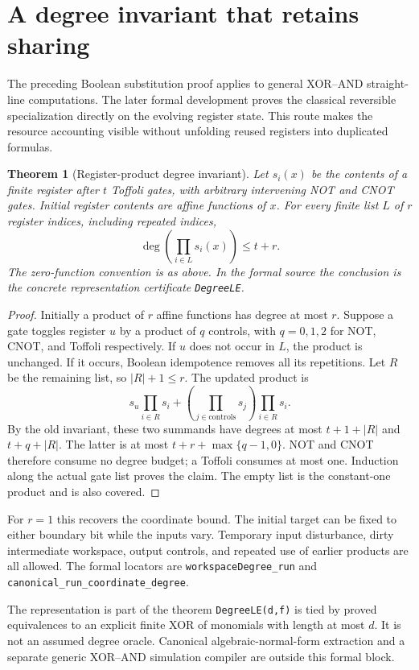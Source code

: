 \documentclass[11pt,letterpaper,oneside]{report}
\theoremstyle{komorebi}
\newtheorem{theorem}{Theorem}[chapter]
\begin{document}
\section{A degree invariant that retains sharing}
The preceding Boolean substitution proof applies to general XOR--AND straight-line computations. The later formal development proves the classical reversible specialization directly on the evolving register state. This route makes the resource accounting visible without unfolding reused registers into duplicated formulas.

\begin{theorem}[Register-product degree invariant]\label{thm:register-products}
Let $s_i(x)$ be the contents of a finite register after $t$ Toffoli gates, with arbitrary intervening NOT and CNOT gates. Initial register contents are affine functions of $x$. For every finite list $L$ of $r$ register indices, including repeated indices,
\[
 \deg\left(\prod_{i\in L}s_i(x)\right)\le t+r.
\]
The zero-function convention is as above. In the formal source the conclusion is the concrete representation certificate \texttt{DegreeLE}.
\end{theorem}
\begin{proof}
Initially a product of $r$ affine functions has degree at most $r$. Suppose a gate toggles register $u$ by a product of $q$ controls, with $q=0,1,2$ for NOT, CNOT, and Toffoli respectively. If $u$ does not occur in $L$, the product is unchanged. If it occurs, Boolean idempotence removes all its repetitions. Let $R$ be the remaining list, so $|R|+1\le r$. The updated product is
\[
 s_u\prod_{i\in R}s_i+
 \left(\prod_{j\in\mathrm{controls}}s_j\right)\prod_{i\in R}s_i.
\]
By the old invariant, these two summands have degrees at most $t+1+|R|$ and $t+q+|R|$. The latter is at most $t+r+\max\{q-1,0\}$. NOT and CNOT therefore consume no degree budget; a Toffoli consumes at most one. Induction along the actual gate list proves the claim. The empty list is the constant-one product and is also covered.
\end{proof}
For $r=1$ this recovers the coordinate bound. The initial target can be fixed to either boundary bit while the inputs vary. Temporary input disturbance, dirty intermediate workspace, output controls, and repeated use of earlier products are all allowed. The formal locators are \texttt{workspaceDegree\_run} and \texttt{canonical\_run\_coordinate\_degree}.

\begin{scopebox}{The representation is part of the theorem}
\texttt{DegreeLE(d,f)} is tied by proved equivalences to an explicit finite XOR of monomials with length at most $d$. It is not an assumed degree oracle. Canonical algebraic-normal-form extraction and a separate generic XOR--AND simulation compiler are outside this formal block.
\end{scopebox}
\end{document}
